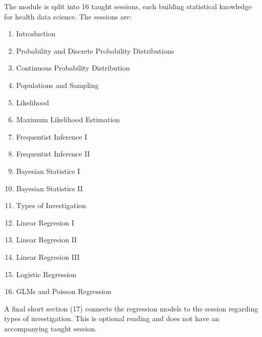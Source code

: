 \documentclass[letterpaper,10pt,english]{jupyterBook}
\begin{document}
\sphinxAtStartPar
The module is split into 16 taught sessions, each building statistical knowledge for health data science. The sessions are:
\begin{enumerate}
%
\item {} 
\sphinxAtStartPar
Introduction

\item {} 
\sphinxAtStartPar
Probability and Discrete Probability Distributions

\item {} 
\sphinxAtStartPar
Continuous Probability Distribution

\item {} 
\sphinxAtStartPar
Populations and Sampling

\item {} 
\sphinxAtStartPar
Likelihood

\item {} 
\sphinxAtStartPar
Maximum Likelihood Estimation

\item {} 
\sphinxAtStartPar
Frequentist Inference I

\item {} 
\sphinxAtStartPar
Frequentist Inference II

\item {} 
\sphinxAtStartPar
Bayesian Statistics I

\item {} 
\sphinxAtStartPar
Bayesian Statistics II

\item {} 
\sphinxAtStartPar
Types of Investigation

\item {} 
\sphinxAtStartPar
Linear Regresion I

\item {} 
\sphinxAtStartPar
Linear Regresion II

\item {} 
\sphinxAtStartPar
Linear Regresion III

\item {} 
\sphinxAtStartPar
Logistic Regression

\item {} 
\sphinxAtStartPar
GLMs and Poisson Regression

\end{enumerate}

\sphinxAtStartPar
A final short section (17) connects the regression models to the session regarding types of investigation. This is optional reading and does not have an accompanying taught session.
\end{document}

